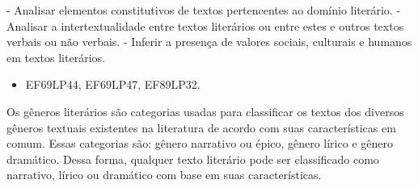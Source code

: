 
- Analisar elementos constitutivos de
textos pertencentes ao domínio literário. - Analisar a intertextualidade
entre textos literários ou entre estes e outros textos verbais ou não
verbais. - Inferir a presença de valores sociais, culturais e humanos em
textos literários.


\begin{itemize}
\tightlist
\item
  EF69LP44, EF69LP47, EF89LP32.
\end{itemize}

Os gêneros literários são categorias usadas para classificar os textos
dos diversos gêneros textuais existentes na literatura de acordo com
suas características em comum. Essas categorias são: gênero narrativo ou
épico, gênero lírico e gênero dramático. Dessa forma, qualquer texto
literário pode ser classificado como narrativo, lírico ou dramático com
base em suas características.

